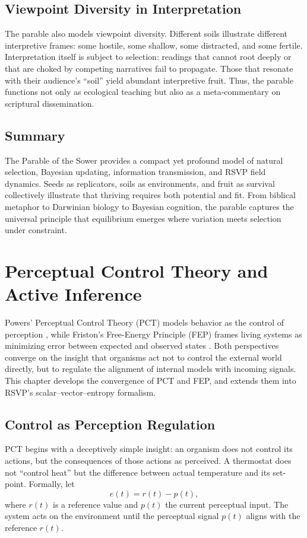 \documentclass[a4paper,11pt,openany]{book}
\begin{document}
\section{Viewpoint Diversity in Interpretation}
The parable also models viewpoint diversity. Different soils illustrate different 
interpretive frames: some hostile, some shallow, some distracted, and some fertile.  
Interpretation itself is subject to selection: readings that cannot root deeply or that are 
choked by competing narratives fail to propagate. Those that resonate with their audience’s 
“soil” yield abundant interpretive fruit. Thus, the parable functions not only as ecological 
teaching but also as a meta-commentary on scriptural dissemination.

\section{Summary}
The Parable of the Sower provides a compact yet profound model of natural selection, Bayesian 
updating, information transmission, and RSVP field dynamics. Seeds as replicators, soils as 
environments, and fruit as survival collectively illustrate that thriving requires both 
potential and fit. From biblical metaphor to Darwinian biology to Bayesian cognition, the 
parable captures the universal principle that equilibrium emerges where variation meets 
selection under constraint.

\chapter{Perceptual Control Theory and Active Inference}

Powers’ Perceptual Control Theory (PCT) models behavior as the control of perception 
\citep{powers1973perception}, while Friston’s Free-Energy Principle (FEP) frames living 
systems as minimizing error between expected and observed states \citep{friston2010freeenergy}. 
Both perspectives converge on the insight that organisms act not to control the external 
world directly, but to regulate the alignment of internal models with incoming signals. 
This chapter develops the convergence of PCT and FEP, and extends them into RSVP’s 
scalar–vector–entropy formalism.

\section{Control as Perception Regulation}
PCT begins with a deceptively simple insight: an organism does not control its actions, 
but the consequences of those actions as perceived. A thermostat does not ``control heat'' 
but the difference between actual temperature and its set-point. Formally, let
\[
e(t) = r(t) - p(t),
\]
where $r(t)$ is a reference value and $p(t)$ the current perceptual input.  
The system acts on the environment until the perceptual signal $p(t)$ aligns with the reference $r(t)$.  
\end{document}
